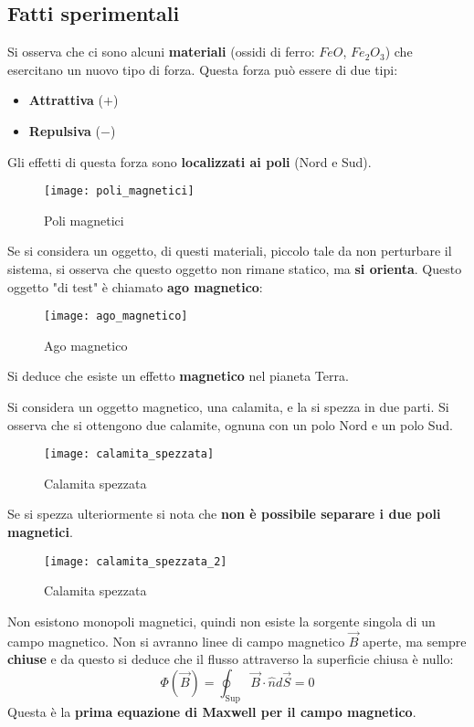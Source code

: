 \documentclass[a4paper]{article}
\begin{document}
\subsection{Fatti sperimentali}
Si osserva che ci sono alcuni \textbf{materiali} (ossidi di ferro:
\( FeO \), \( Fe_2O_3 \)) che esercitano un nuovo tipo di forza.
Questa forza può essere di due tipi:
\begin{itemize}
  \item \textbf{Attrattiva} (\( + \))
  \item \textbf{Repulsiva} (\( - \))
\end{itemize}
Gli effetti di questa forza sono \textbf{localizzati ai poli} (Nord e Sud).
\begin{figure}[H]
  \centering
  \texttt{[image: poli\_magnetici]}
  \caption{Poli magnetici}
\end{figure}
\noindent
Se si considera un oggetto, di questi materiali, piccolo tale da non perturbare il sistema,
si osserva che questo oggetto non rimane statico, ma \textbf{si orienta}. Questo oggetto
"di test" è chiamato \textbf{ago magnetico}:
\begin{figure}[H]
  \centering
  \texttt{[image: ago\_magnetico]}
  \caption{Ago magnetico}
\end{figure}
\noindent
Si deduce che esiste un effetto \textbf{magnetico} nel pianeta Terra.

\begin{example}
  Si considera un oggetto magnetico, una calamita, e la si spezza in due parti. Si
  osserva che si ottengono due calamite, ognuna con un polo Nord e un polo Sud.
  \begin{figure}[H]
    \centering
    \texttt{[image: calamita\_spezzata]}
    \caption{Calamita spezzata}
  \end{figure}
  \noindent
  Se si spezza ulteriormente si nota che \textbf{non è possibile separare i due poli
  magnetici}.
  \begin{figure}[H]
    \centering
    \texttt{[image: calamita\_spezzata\_2]}
    \caption{Calamita spezzata}
  \end{figure}
  \noindent
  Non esistono monopoli magnetici, quindi non
  esiste la sorgente singola di un campo magnetico. Non si avranno linee di campo magnetico
  \( \vec{B} \) aperte, ma sempre \textbf{chiuse} e da questo si deduce che il flusso
  attraverso la superficie chiusa è nullo:
  \[
    \Phi(\vec{B}) = \oint_{\text{Sup}} \vec{B} \cdot \hat{n} d\vec{S} = 0
  \] 
  Questa è la \textbf{prima equazione di Maxwell per il campo magnetico}.
\end{example}
\end{document}
